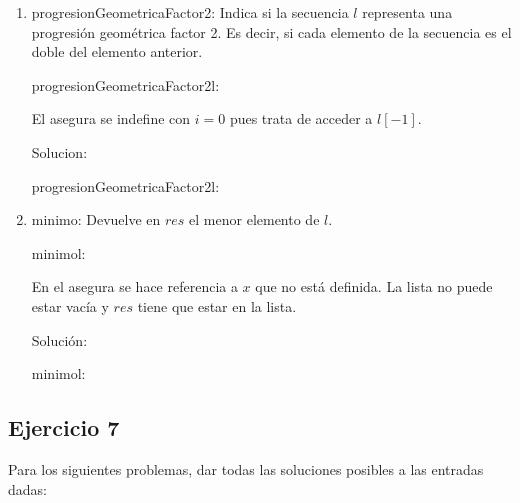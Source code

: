 \begin{enumerate}[label=\alph*)]
      \item progresionGeometricaFactor2: Indica si la secuencia $l$ representa una progresión geométrica factor 2. Es decir, si cada elemento de la secuencia es el doble del elemento anterior.

            \begin{proc}{progresionGeometricaFactor2}{\In l: \TLista{\ent}}{\bool}
            \end{proc}

            El asegura se indefine con $i = 0$ pues trata de acceder a $l[-1]$.

            Solucion: \begin{proc}{progresionGeometricaFactor2}{\In l: \TLista{\ent}}{\bool}
            \end{proc}

      \item minimo: Devuelve en $res$ el menor elemento de $l$.

            \begin{proc}{minimo}{\In l: \TLista{\ent}}{\ent}
            \end{proc}

            En el asegura se hace referencia a $x$ que no está definida. La lista no puede estar vacía y $res$ tiene que estar en la lista.

            Solución: \begin{proc}{minimo}{\In l: \TLista{\ent}}{\ent}
            \end{proc}
\end{enumerate}

\subsection{Ejercicio 7}
Para los siguientes problemas, dar todas las soluciones posibles a las entradas dadas:

